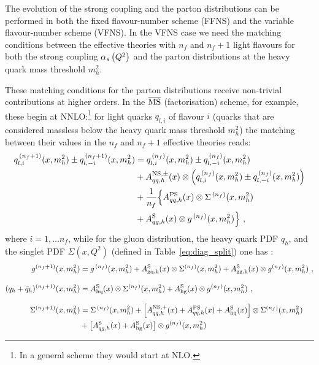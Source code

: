 The evolution of the strong coupling and the parton distributions can
be performed in both the fixed flavour-number scheme (FFNS) and the 
variable flavour-number scheme (VFNS). In the VFNS case we 
need the matching conditions between the effective
theories with $n_f$ and $n_{f}+1$ light flavours for both the strong 
coupling $\alpha_s\left( Q^2 \right)$ and the parton distributions at the heavy quark
mass threshold $m_h^2$.

These matching conditions for the parton distributions
receive non-trivial contributions at higher orders. In the $\overline{\mathrm{MS}}$
(factorisation) scheme, for example,
these begin at NNLO:\footnote{In
  a general scheme they would start at NLO.} %
for light quarks $q_{l,i}$ of flavour $i$ 
(quarks that are considered massless
below the heavy quark mass threshold $m_h^2$) the matching between
their values in the $n_f$ and
$n_f+1$ effective theories reads:
\begin{align}
\label{eq:lp-nf1}
  q_{l,i}^{\,(n_f+1)}(x,m_h^2) \pm q_{l,-i}^{\,(n_f+1)}(x,m_h^2)  & =   q_{l,i}^{\,(n_f)}(x,m_h^2) \pm q_{l,-i}^{\,(n_f)}(x,m_h^2) \notag \\ &+
   A^{\rm NS,\pm}_{qq,h}(x) \otimes \left(
   q_{l,i}^{\, (n_f)}(x,m_h^2) \pm q_{l,-i}^{\, (n_f)}(x,m_h^2)\right) \notag\\
   & + \frac{1}{n_f} \Big\{A^{\rm PS}_{qq,h}(x) \otimes \Sigma^{\, (n_f)}(x,m_h^2) \notag\\
   & + A^{\rm S}_{qg,h}(x) \otimes g^{\, (n_f)}(x,m_h^2)\Big\} \ ,
\end{align}
where $i = 1,\ldots n_f$, while for the gluon distribution, the heavy
quark PDF $q_h$, and the singlet PDF $\Sigma(x,Q^2)$ (defined in
Table~\ref{eq:diag_split}) one has :
\begin{align}
\label{eq:hp-nf1}
  g^{(n_f+1)}(x,m_h^2)  &=
    g^{\, (n_f)}(x,m_h^2) +
    A_{\rm gq,h}^{\rm S}(x) \otimes \Sigma^{(n_f)}(x,m_h^2) +
    A_{\rm gg,h}^{\rm S}(x) \otimes g^{(n_f)}(x,m_h^2) \ ,
  \nonumber \\[0.3cm]
  (q_h+\bar{q}_{h})^{(n_f+1)}(x,m_h^2)  &=
  A_{\rm hq}^{\rm S}(x)\otimes \Sigma^{(n_f)}(x,m_h^2) 
  + A_{\rm hg}^{\rm S}(x)\otimes g^{(n_f)}(x,m_h^2)\ ,  \nonumber \\[0.3cm]
  \Sigma^{(n_f+1)}(x,m_h^2)  &= \Sigma^{\, (n_f)}(x,m_h^2) + \left[ A^{\rm NS,+}_{qq,h}(x) + A^{\rm PS}_{qq,h}(x) + A_{\rm hq}^{\rm S}(x)\right] \otimes \Sigma^{(n_f)}(x,m_h^2) \nonumber \\
  & + \left[ A^{\rm S}_{qg,h}(x) + A_{\rm hg}^{\rm S}(x) \right] \otimes g^{(n_f)}(x,m_h^2)
\end{align}
